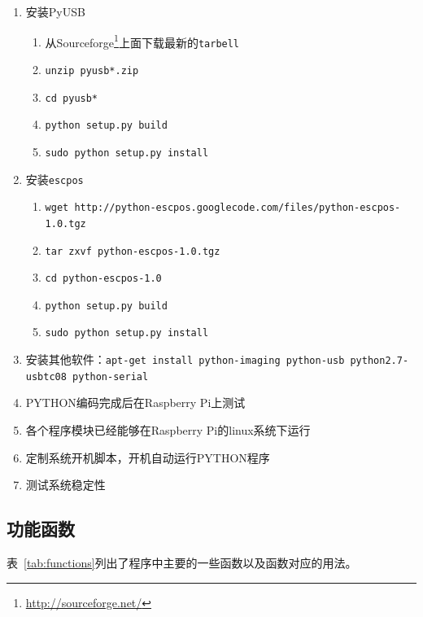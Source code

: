 \begin{enumerate}
\item 安装PyUSB
  \begin{enumerate}
  \item 从Sourceforge\footnote{\url{http://sourceforge.net/}}上面下载最新的\verb|tarbell|
  \item \verb|unzip pyusb*.zip|
  \item \verb|cd pyusb*|
  \item \verb|python setup.py build|
  \item \verb|sudo python setup.py install|
  \end{enumerate}
\item 安装\verb|escpos|
  \begin{enumerate}
  \item \verb|wget http://python-escpos.googlecode.com/files/python-escpos-1.0.tgz|
  \item \verb|tar zxvf python-escpos-1.0.tgz|
  \item \verb|cd python-escpos-1.0|
  \item \verb|python setup.py build|
  \item \verb|sudo python setup.py install|
  \end{enumerate}
\item 安装其他软件：\verb|apt-get install python-imaging python-usb python2.7-usbtc08 python-serial|
\item PYTHON编码完成后在Raspberry Pi上测试
\item 各个程序模块已经能够在Raspberry Pi的linux系统下运行
\item 定制系统开机脚本，开机自动运行PYTHON程序
\item 测试系统稳定性
\end{enumerate}

\subsection{功能函数}

表~\ref{tab:functions}列出了程序中主要的一些函数以及函数对应的用法。

